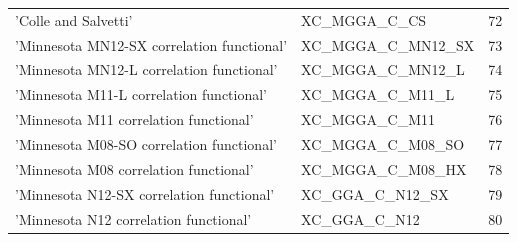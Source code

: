 \documentclass[final,12pt,makeidx,DIV=calc]{article}
\begin{document}
{{{{{{\begin{table}[!h]
\begin{center}
\begin{tabular}{llr}
  'Colle and Salvetti' & XC\_MGGA\_C\_CS  & 72\\
  'Minnesota MN12-SX correlation functional' & XC\_MGGA\_C\_MN12\_SX  & 73\\
  'Minnesota MN12-L correlation functional' & XC\_MGGA\_C\_MN12\_L  & 74\\
  'Minnesota M11-L correlation functional' & XC\_MGGA\_C\_M11\_L  & 75\\
  'Minnesota M11 correlation functional' & XC\_MGGA\_C\_M11  & 76\\
  'Minnesota M08-SO correlation functional' & XC\_MGGA\_C\_M08\_SO  & 77\\
  'Minnesota M08 correlation functional' & XC\_MGGA\_C\_M08\_HX  & 78\\
  'Minnesota N12-SX correlation functional' & XC\_GGA\_C\_N12\_SX  & 79\\
  'Minnesota N12 correlation functional' & XC\_GGA\_C\_N12  & 80\\
\hline
\hline
\end{tabular}
\end{center}
\end{table}

}}}}}}
\end{document}
